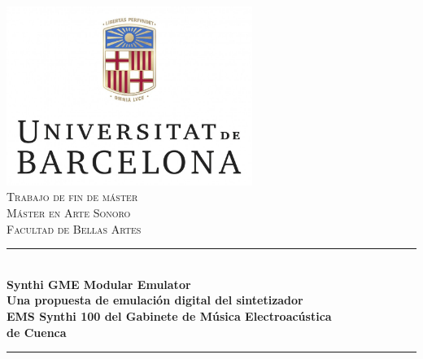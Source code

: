 \begin{titlepage}

\newcommand{\HRule}{\rule{\linewidth}{0.5mm}} %

\center %


\includegraphics[width=0.6\textwidth]{./portada/logoUB}\\[1cm] %
 

\textsc{\LARGE Trabajo de fin de máster}\\[1cm] %
\textsc{\Large Máster en Arte Sonoro}\\[0.5cm] %
\textsc{\large Facultad de Bellas Artes}\\[0.0cm] %


\HRule \\[0.0cm]
{ \Large \bfseries Synthi GME Modular Emulator\\ \vspace{0.4cm} \normalsize Una propuesta de emulación digital del sintetizador\\ EMS Synthi 100 del Gabinete de Música Electroacústica\\de Cuenca}\\[0.1cm] %
\HRule \\[0.3cm]
 

\end{titlepage}
